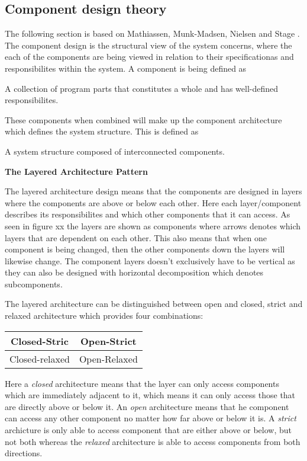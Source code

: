 \subsection{Component design theory} \label{archicomponents}
The following section is based on Mathiassen, Munk-Madsen, Nielsen and Stage \cite{Rod-Aalborg}.
The component design is the structural view of the system concerns, where the each of the components are being viewed in relation to their specificationas and responsibilites within the system.
A component is being defined as
\begin{defn}
	A collection of program parts that constitutes a whole and has well-defined responsibilites. \citep[p.~192]{Rod-Aalborg}
\end{defn}
These components when combined will make up the component architecture which defines the system structure.
This is defined as
\begin{defn}
	A system structure composed of interconnected components. \citep[p.~192]{Rod-Aalborg}
\end{defn}

\textbf{The Layered Architecture Pattern}

The layered architecture design means that the components are designed in layers where the components are above or below each other.
Here each layer/component describes its responsibilites and which other components that it can access.
As seen in figure xx the layers are shown as components where arrows denotes which layers that are dependent on each other.
This also means that when one component is being changed, then the other components down the layers will likewise change.
The component layers doesn't exclusively have to be vertical as they can also be designed with horizontal decomposition which denotes subcomponents.

The layered architecture can be distinguished between open and closed, strict and relaxed architecture which provides four combinations:

\begin{center}
	\begin{tabular}{| c | c |}
		\hline
		Closed-Stric & Open-Strict \\
		\hline
		Closed-relaxed & Open-Relaxed \\
		\hline
	\end{tabular}
\end{center}

Here a \textit{closed} architecture means that the layer can only access components which are immediately adjacent to it, which means it can only access those that are directly above or below it.
An \textit{open} architecture means that he component can access any other component no matter how far above or below it is.
A \textit{strict} archicture is only able to access component that are either above or below, but not both whereas the \textit{relaxed} architecture is able to access components from both directions.

